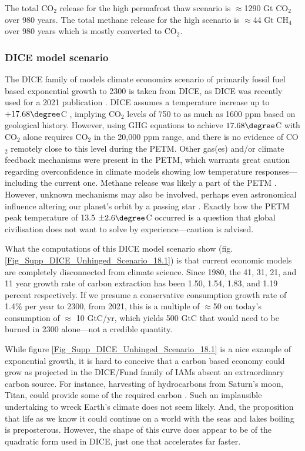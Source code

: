 \documentclass{article}
\begin{document}
 The total CO$_2$ release for the high permafrost thaw scenario is $\approx$1290 Gt CO$_2$ over 980 years. The total methane release for the high scenario is $\approx$44 Gt CH$_4$ over 980 years which is mostly converted to CO$_2$. 

\subsubsection{DICE model scenario}
\label{DICE_Model_scenario}
The DICE family of models climate economics scenario of primarily fossil fuel based exponential growth to 2300 is taken from DICE, as DICE was recently used for a 2021 publication \cite{dietz2021tipping}. DICE assumes a temperature increase up to $+17.68 \degree$C \cite[p. 45]{dietz2021supplement}, implying CO$_2$ levels of 750 to as much as 1600 ppm \cite{Keery2018EoceneCO2Sensitivity} based on geological history. However, using GHG equations to achieve $17.68 \degree$C with CO$_2$ alone requires CO$_2$ in the 20,000 ppm range, and there is no evidence of CO$_2$ remotely close to this level during the PETM. Other gas(es) and/or climate feedback mechanisms were present in the PETM, which warrants great caution regarding overconfidence in climate models showing low temperature responses---including the current one. Methane release was likely a part of the PETM \cite{Frieling2016,Frieling2019,Inglis2020,Inglis2020_Supp}. However, unknown mechanisms may also be involved, perhaps even astronomical influence altering our planet's orbit by a passing star \cite{Kaib2024PassingStars}. Exactly how the PETM peak temperature of 13.5 $\pm 2.6\degree$C occurred is a question that global civilisation does not want to solve by experience---caution is advised.

What the computations of this DICE model scenario show (fig. \ref{Fig_Supp_DICE_Unhinged_Scenario_18.1}) is that current economic models are completely disconnected from climate science. Since 1980, the 41, 31, 21, and 11 year growth rate of carbon extraction has been 1.50, 1.54, 1.83, and 1.19 percent respectively. If we presume a conservative consumption growth rate of 1.4\% per year to 2300, from 2021, this is a multiple of $\approx$50 on today's consumption of $\approx$ 10 GtC/yr, which yields 500 GtC that would need to be burned in 2300 alone---not a credible quantity. 

While figure \ref{Fig_Supp_DICE_Unhinged_Scenario_18.1} is a nice example of exponential growth, it is hard to conceive that a carbon based economy could grow as projected in the DICE/Fund family of IAMs absent an extraordinary carbon source. For instance, harvesting of hydrocarbons from Saturn's moon, Titan, could provide some of the required carbon \cite{Lorenz2008TitanOrganicInventory}. Such an implausible undertaking to wreck Earth's climate does not seem likely. And, the proposition that life as we know it could continue on a world with the seas and lakes boiling is preposterous. However, the shape of this curve does appear to be of the quadratic form used in DICE, just one that accelerates far faster. 
\end{document}
